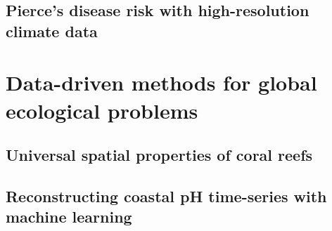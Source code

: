 \documentclass[
	10pt, %
	a4paper, %
]{LegrandOrangeBook}
\begin{document}
\chapter{Pierce's disease risk with high-resolution climate data}

 {
  \hypersetup{hidelinks}
  \part{Data-driven methods for global ecological problems}
 }


\chapterspaceabove{6.75cm}
\chapterspacebelow{7.25cm}

\chapter{Universal spatial properties of coral reefs}
%

\chapterspaceabove{6.75cm}
\chapterspacebelow{7.25cm}

\chapter{Reconstructing coastal pH time-series with machine learning}
%

\chapterspaceabove{6.75cm}
\chapterspacebelow{7.25cm}
\end{document}

